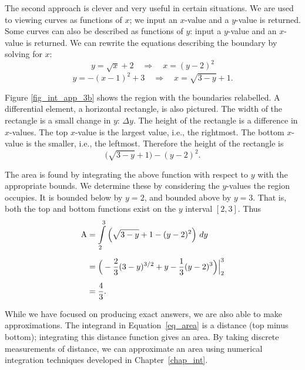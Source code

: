 \begin{example}
The second approach is clever and very useful in certain situations. We are used to viewing curves as functions of $x$; we input an $x$-value and a $y$-value is returned. Some curves can also be described as functions of $y$: input a $y$-value and an $x$-value is returned. We can rewrite the equations describing the boundary by solving for $x$:
	$$y=\sqrt{x}+2 \quad \Rightarrow\quad x=(y-2)^2$$
	$$y=-(x-1)^2+3 \quad \Rightarrow \quad x=\sqrt{3-y}+1.$$


Figure \ref{fig_int_app_3b} shows the region with the boundaries relabelled. A differential element, a horizontal rectangle, is also pictured.	The width of the rectangle is a small change in $y$: $\Delta y$. The height of the rectangle is a difference in $x$-values. The top $x$-value is the largest value, i.e., the rightmost. The bottom $x$-value is the smaller, i.e., the leftmost. Therefore the height of the rectangle is $$\big(\sqrt{3-y}+1\big) - (y-2)^2.$$

The area is found by integrating the above function with respect to $y$ with the appropriate bounds. We determine these by considering the $y$-values the region occupies. It is bounded below by $y=2$, and bounded above by $y=3$. That is, both the top and bottom functions exist on the $y$ interval $[2,3]$. Thus
\begin{align*}
\text{A} &= \displaystyle\int\limits_2^3 \Big(\sqrt{3-y}+1 - (y-2)^2\Big)\ dy \\[0.2cm]
			&= \Big(-\frac23(3-y)^{3/2}+y-\frac13(y-2)^3\Big)\Big|_2^3 \\[0.2cm]
			&= \dfrac{4}{3}.
\end{align*}



\end{example}

While we have focused on producing exact answers, we are also able to make approximations. The integrand in Equation~\eqref{eq_area} is a distance (top minus bottom); integrating this distance function gives an area. By taking discrete measurements of distance, we can approximate an area using numerical integration techniques developed in Chapter~\ref{chap_int}.


